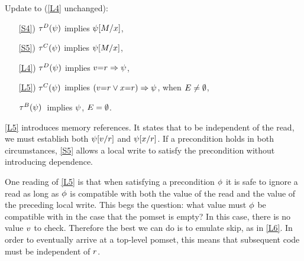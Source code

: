 
\begin{definition}[\xLIR]
  \label{def:pomsets-lir}
  Update  to (\ref{L4} unchanged):
  \begin{enumerate}
  \item[\ref{S4})]
    $\aTr{\bEvs}{\bForm}$ implies $\psi[M/x]$,
  \item[\ref{S5})]
    $\aTr{\cEvs}{\bForm}$ implies $\psi[M/x]$,
  \item[\ref{L4})]
    $\aTr{\bEvs}{\bForm}$ implies $v{=}r\Rightarrow\psi$, 
  \item[\ref{L5})]
    $\aTr{\cEvs}{\bForm}$ implies
    $(v{=}r\lor x{=}r)\Rightarrow\psi$, when $E\neq\emptyset$,
  \item[{\labeltext[L6]{L6)}{L6}}] 
    $\aTr{\dEvs}{\bForm}\;$ implies $\psi$, $E=\emptyset$.
  \end{enumerate}
\end{definition}

\ref{L5} introduces memory references.  It states that to be independent of
the read, we must establish both $\psi[v/r]$ and $\psi[x/r]$.
If a precondition holds in both circumstances, \ref{S5} allows a local write
to satisfy the precondition without introducing dependence.

One reading of \ref{L5} is that when satisfying a precondition $\phi$ it is
safe to ignore a read as long as $\phi$ is compatible with both the value
of the read and the value of the preceding local write.  This begs the
question: what value must $\phi$ be compatible with in the case that the
pomset is empty?  In this case, there is no value $v$ to check.
Therefore the best we can do is to emulate skip, as in \ref{L6}.  In order to
eventually arrive at a top-level pomset, this means that subsequent code must
be independent of $r$.

